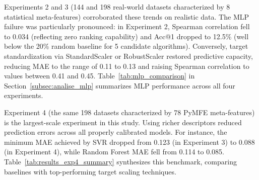 \documentclass[12pt]{article}
\begin{document}
Experiments 2 and 3 (144 and 198 real-world datasets characterized by 8 statistical meta-features) corroborated these trends on realistic data. The MLP failure was particularly pronounced: in Experiment 2, Spearman correlation fell to 0.034 (reflecting zero ranking capability) and Acc@1 dropped to 12.5\% (well below the 20\% random baseline for 5 candidate algorithms). Conversely, target standardization via StandardScaler or RobustScaler restored predictive capacity, reducing MAE to the range of 0.11 to 0.13 and raising Spearman correlation to values between 0.41 and 0.45. Table~\ref{tab:mlp_comparison} in Section~\ref{subsec:analise_mlp} summarizes MLP performance across all four experiments.

Experiment 4 (the same 198 datasets characterized by 78 PyMFE meta-features) is the largest-scale experiment in this study. Using richer descriptors reduced prediction errors across all properly calibrated models. For instance, the minimum MAE achieved by SVR dropped from 0.123 (in Experiment 3) to 0.088 (in Experiment 4), while Random Forest MAE fell from 0.114 to 0.085. Table~\ref{tab:results_exp4_summary} synthesizes this benchmark, comparing baselines with top-performing target scaling techniques.
\end{document}
